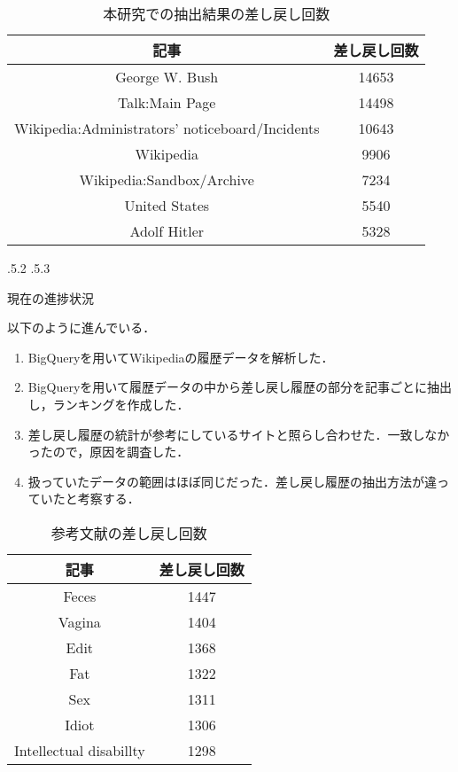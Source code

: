 \documentclass[uplatex]{jsarticle}
\makeatletter
\renewcommand{\section}{%
    \if@slide\clearpage\fi
    \@startsection{section}{1}{\z@}%
    {\Cvs \@plus.5\Cdp \@minus.2\Cdp}%
    {.5\Cvs \@plus.3\Cdp}%
    {\normalfont\raggedright}}
\makeatother
\begin{document}
\begin{wraptable}[10]{r}{10cm}
\vspace*{-\intextsep}
\caption{本研究での抽出結果の差し戻し回数}\label{サンプル表}
\begin{tabular}{|c|c|}
\hline
記事 & 差し戻し回数\\
\hline
George W. Bush & 14653\\
Talk:Main Page & 14498\\
Wikipedia:Administrators' noticeboard/Incidents & 10643\\
Wikipedia & 9906\\
Wikipedia:Sandbox/Archive & 7234\\
United States & 5540\\
Adolf Hitler & 5328\\
\hline
\end{tabular}
\end{wraptable}




\section{現在の進捗状況}

以下のように進んでいる．

\begin{enumerate}
\item BigQueryを用いてWikipediaの履歴データを解析した．
\item BigQueryを用いて履歴データの中から差し戻し履歴の部分を記事ごとに抽出し，ランキングを作成した．
\item 差し戻し履歴の統計が参考にしているサイトと照らし合わせた．一致しなかったので，原因を調査した．
\item 扱っていたデータの範囲はほぼ同じだった．差し戻し履歴の抽出方法が違っていたと考察する．
\end{enumerate}


\begin{wraptable}[7]{r}{6cm}
\vspace*{-\intextsep}
\caption{参考文献の差し戻し回数}\label{サンプル表}
\begin{tabular}{|c|c|}
\hline
記事 & 差し戻し回数\\
\hline
Feces & 1447\\
Vagina & 1404\\
Edit & 1368\\
Fat & 1322\\
Sex & 1311\\
Idiot & 1306\\
Intellectual disabillty & 1298\\
\hline
\end{tabular}
\end{wraptable}
\end{document}
